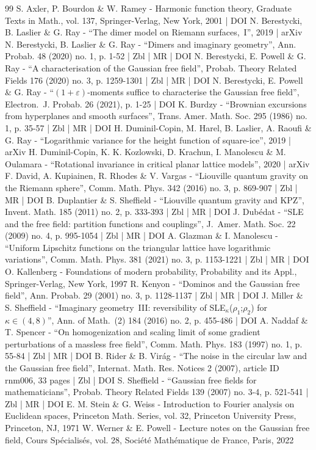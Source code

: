 \documentclass[10pt]{amsart}
\theoremstyle{definition}
\begin{document}
\begin{thebibliography}{99}
S. Axler, P. Bourdon \& W. Ramey - Harmonic function theory, Graduate Texts in Math., vol. 137, Springer-Verlag, New York, 2001 | DOI
N. Berestycki, B. Laslier \& G. Ray - “The dimer model on Riemann surfaces, I”, 2019 | arXiv
N. Berestycki, B. Laslier \& G. Ray - “Dimers and imaginary geometry”, Ann. Probab. 48 (2020) no. 1, p. 1-52 | Zbl | MR | DOI
N. Berestycki, E. Powell \& G. Ray - “A characterisation of the Gaussian free field”, Probab. Theory Related Fields 176 (2020) no. 3, p. 1259-1301 | Zbl | MR | DOI
N. Berestycki, E. Powell \& G. Ray - “$(1+\varepsilon )$-moments suffice to characterise the Gaussian free field”, Electron. J. Probab. 26 (2021), p. 1-25 | DOI
K. Burdzy - “Brownian excursions from hyperplanes and smooth surfaces”, Trans. Amer. Math. Soc. 295 (1986) no. 1, p. 35-57 | Zbl | MR | DOI
H. Duminil-Copin, M. Harel, B. Laslier, A. Raoufi \& G. Ray - “Logarithmic variance for the height function of square-ice”, 2019 | arXiv
H. Duminil-Copin, K. K. Kozlowski, D. Krachun, I. Manolescu \& M. Oulamara - “Rotational invariance in critical planar lattice models”, 2020 | arXiv
F. David, A. Kupiainen, R. Rhodes \& V. Vargas - “Liouville quantum gravity on the Riemann sphere”, Comm. Math. Phys. 342 (2016) no. 3, p. 869-907 | Zbl | MR | DOI
B. Duplantier \& S. Sheffield - “Liouville quantum gravity and KPZ”, Invent. Math. 185 (2011) no. 2, p. 333-393 | Zbl | MR | DOI
J. Dubédat - “SLE and the free field: partition functions and couplings”, J. Amer. Math. Soc. 22 (2009) no. 4, p. 995-1054 | Zbl | MR | DOI
A. Glazman \& I. Manolescu - “Uniform Lipschitz functions on the triangular lattice have logarithmic variations”, Comm. Math. Phys. 381 (2021) no. 3, p. 1153-1221 | Zbl | MR | DOI
O. Kallenberg - Foundations of modern probability, Probability and its Appl., Springer-Verlag, New York, 1997
R. Kenyon - “Dominos and the Gaussian free field”, Ann. Probab. 29 (2001) no. 3, p. 1128-1137 | Zbl | MR | DOI
J. Miller \& S. Sheffield - “Imaginary geometry III: reversibility of SLE$_\kappa $($\rho _1$;$\rho _2$) for $\kappa \in (4, 8)$”, Ann. of Math. (2) 184 (2016) no. 2, p. 455-486 | DOI
A. Naddaf \& T. Spencer - “On homogenization and scaling limit of some gradient perturbations of a massless free field”, Comm. Math. Phys. 183 (1997) no. 1, p. 55-84 | Zbl | MR | DOI
B. Rider \& B. Virág - “The noise in the circular law and the Gaussian free field”, Internat. Math. Res. Notices 2 (2007), article ID rnm006, 33 pages | Zbl | DOI
S. Sheffield - “Gaussian free fields for mathematicians”, Probab. Theory Related Fields 139 (2007) no. 3-4, p. 521-541 | Zbl | MR | DOI
E. M. Stein \& G. Weiss - Introduction to Fourier analysis on Euclidean spaces, Princeton Math. Series, vol. 32, Princeton University Press, Princeton, NJ, 1971
W. Werner \& E. Powell - Lecture notes on the Gaussian free field, Cours Spécialisés, vol. 28, Société Mathématique de France, Paris, 2022
\end{thebibliography}
\end{document}
